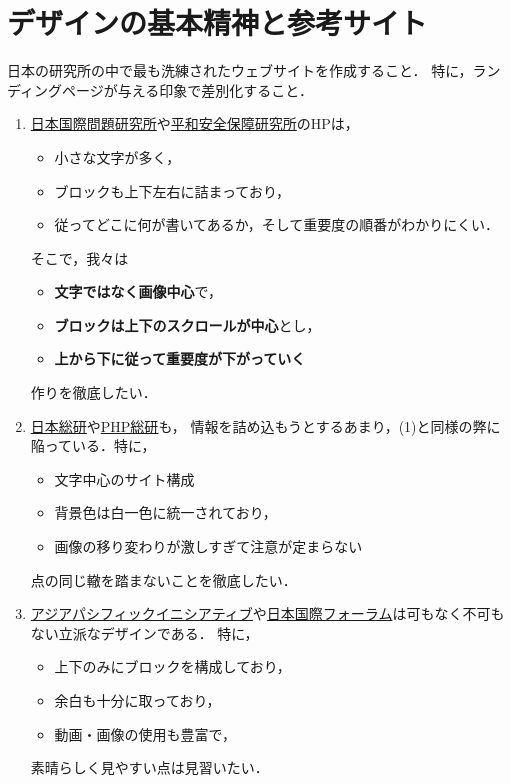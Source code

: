 \documentclass[uplatex,dvipdfmx]{jsarticle}
\begin{document}
\section{デザインの基本精神と参考サイト}

\begin{tcolorbox}[colframe=ForestGreen, colback=ForestGreen!10!white,breakable,colbacktitle=ForestGreen!40!white,coltitle=black,fonttitle=\bfseries\sffamily,
title=基本哲学]
    日本の研究所の中で最も洗練されたウェブサイトを作成すること．
    特に，ランディングページが与える印象で差別化すること．
\end{tcolorbox}

\begin{example}[差別化したいところの日本サイト]\mbox{}\label{exp-domestic}
    \begin{enumerate}
        \item \href{https://www.jiia.or.jp/}{日本国際問題研究所}や\href{https://www.rips.or.jp/}{平和安全保障研究所}のHPは，
        \begin{itemize}
            \item 小さな文字が多く，
            \item ブロックも上下左右に詰まっており，
            \item 従ってどこに何が書いてあるか，そして重要度の順番がわかりにくい．
        \end{itemize}
        そこで，我々は
        \begin{itemize}
            \item \textbf{文字ではなく画像中心}で，
            \item \textbf{ブロックは上下のスクロールが中心}とし，
            \item \textbf{上から下に従って重要度が下がっていく}
        \end{itemize}
        作りを徹底したい．
        \item \href{https://www.jri.co.jp/}{日本総研}や\href{https://thinktank.php.co.jp/}{PHP総研}も，
        情報を詰め込もうとするあまり，(1)と同様の弊に陥っている．特に，
        \begin{itemize}
            \item 文字中心のサイト構成
            \item 背景色は白一色に統一されており，
            \item 画像の移り変わりが激しすぎて注意が定まらない
        \end{itemize}
        点の同じ轍を踏まないことを徹底したい．
        \item \href{https://apinitiative.org/}{アジアパシフィックイニシアティブ}や\href{https://www.jfir.or.jp/}{日本国際フォーラム}は可もなく不可もない立派なデザインである．
        特に，
        \begin{itemize}
            \item 上下のみにブロックを構成しており，
            \item 余白も十分に取っており，
            \item 動画・画像の使用も豊富で，
        \end{itemize}
        素晴らしく見やすい点は見習いたい．
        

\end{enumerate}
\end{example}
\end{document}
